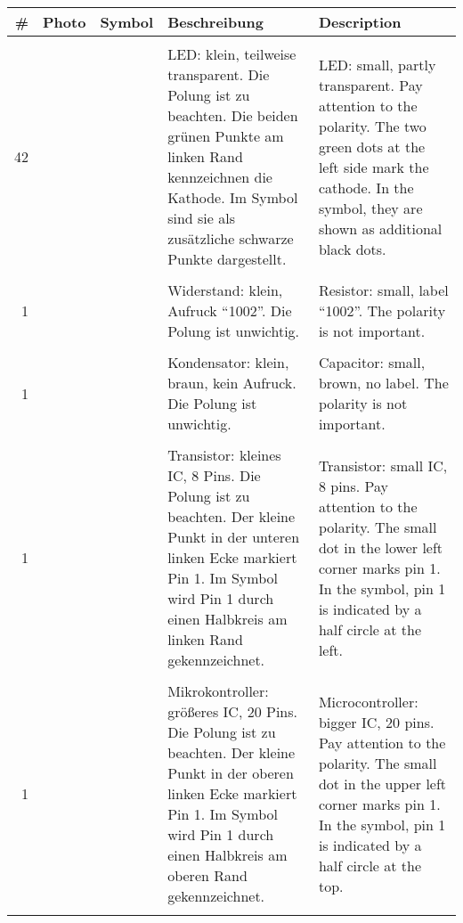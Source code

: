 \documentclass[a4paper]{article}
\newcommand{\vtopimage}[2]{
  \setlength\fboxsep{1pt}
  \setlength\fboxrule{0pt}
  \fbox{\texttt{[image: \#2]}}
}
\newcommand{\partimage}[1]{\vtopimage{.1\textwidth}{#1}}
\newcommand{\partphoto}[1]{\partimage{photos/#1.pdf}}
\newcommand{\partsymbol}[1]{\partimage{symbols/#1.pdf}}
\begin{document}
\begin{tabular}{rm{}m{}m{}m{}}
  \# & Photo & Symbol &
    Beschreibung & Description \\
  \hline
  \\
  42 & \partphoto{led} & \partsymbol{led} &
    LED: klein, teilweise transparent. Die Polung ist zu beachten.
    Die beiden grünen Punkte am linken Rand kennzeichnen die Kathode.
    Im Symbol sind sie als zusätzliche schwarze Punkte dargestellt. &
    LED: small, partly transparent. Pay attention to the polarity.
    The two green dots at the left side mark the cathode.
    In the symbol, they are shown as additional black dots. \newline \\
  \\
  1 & \partphoto{resistor} & \partsymbol{resistor} &
    Widerstand: klein, Aufruck ``1002''. Die Polung ist unwichtig. &
    Resistor: small, label ``1002''. The polarity is not important. \\
  \\
  1 & \partphoto{capacitor} & \partsymbol{capacitor} &
    Kondensator: klein, braun, kein Aufruck. Die Polung ist unwichtig. &
    Capacitor: small, brown, no label. The polarity is not important. \\
  \\
  1 & \partphoto{transistor} & \partsymbol{transistor} &
    Transistor: kleines IC, 8 Pins. Die Polung ist zu beachten.
    Der kleine Punkt in der unteren linken Ecke markiert Pin 1.
    Im Symbol wird Pin 1 durch einen Halbkreis am linken Rand gekennzeichnet. &
    Transistor: small IC, 8 pins. Pay attention to the polarity.
    The small dot in the lower left corner marks pin 1.
    In the symbol, pin 1 is indicated by a half circle at the left. \newline \\
  \\
  1 & \partphoto{microcontroller} & \partsymbol{microcontroller} &
    Mikrokontroller: größeres IC, 20 Pins. Die Polung ist zu beachten.
    Der kleine Punkt in der oberen linken Ecke markiert Pin 1.
    Im Symbol wird Pin 1 durch einen Halbkreis am oberen Rand gekennzeichnet. &
    Microcontroller: bigger IC, 20 pins. Pay attention to the polarity.
    The small dot in the upper left corner marks pin 1.
    In the symbol, pin 1 is indicated by a half circle at the top. \newline \\
  \\

\end{tabular}
\end{document}

